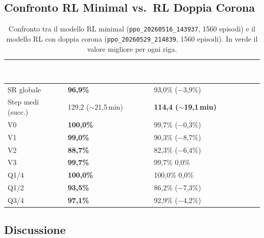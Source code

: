 \documentclass[12pt, a4paper]{article}
\begin{document}
\subsection{Confronto RL Minimal vs.\ RL Doppia Corona}

\begin{table}[H]
\centering
\renewcommand{\arraystretch}{1.3}
\small
\begin{tabular}{L{4.2cm} C{3.2cm} C{3.2cm}}
\toprule
{}
\textcolor{white}{\textbf{Metrica}} &
\textcolor{white}{\textbf{RL Minimal (116-dim)}} &
\textcolor{white}{\textbf{RL Doppia Corona (196-dim)}} \\
\midrule
{}
SR globale          & \textbf{96{,}9\%}  & 93{,}0\% {\scriptsize\textcolor{red!60!black}{($-$3{,}9\%)}} \\
Step medi (succ.)   & 129{,}2 ($\sim$21{,}5\,min) & \textbf{114{,}4 ($\sim$19{,}1\,min)} \\
V0                  & \textbf{100{,}0\%} & 99{,}7\%  {\scriptsize\textcolor{red!60!black}{($-$0{,}3\%)}} \\
V1                  & \textbf{99{,}0\%}  & 90{,}3\%  {\scriptsize\textcolor{red!60!black}{($-$8{,}7\%)}} \\
V2                  & \textbf{88{,}7\%}  & 82{,}3\%  {\scriptsize\textcolor{red!60!black}{($-$6{,}4\%)}} \\
V3                  & \textbf{99{,}7\%}  & 99{,}7\%  {\scriptsize 0{,}0\%} \\
Q1/4                & \textbf{100{,}0\%} & 100{,}0\% {\scriptsize 0{,}0\%} \\
Q1/2                & \textbf{93{,}5\%}  & 86{,}2\%  {\scriptsize\textcolor{red!60!black}{($-$7{,}3\%)}} \\
Q3/4                & \textbf{97{,}1\%}  & 92{,}9\%  {\scriptsize\textcolor{red!60!black}{($-$4{,}2\%)}} \\
\bottomrule
\end{tabular}
\caption{Confronto tra il modello RL minimal (\texttt{ppo\_20260516\_143937}, 1560 episodi)
         e il modello RL con doppia corona (\texttt{ppo\_20260529\_214839}, 1560 episodi).
         In verde il valore migliore per ogni riga.}
\end{table}

\subsection{Discussione}
\end{document}
